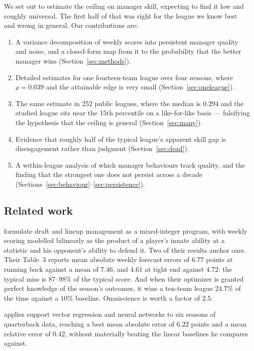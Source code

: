 \documentclass[11pt]{article}
\begin{document}
We set out to estimate the ceiling on manager skill, expecting to find it low
and roughly universal. The first half of that was right for the league we know
best and wrong in general. Our contributions are:

\begin{enumerate}
\item A variance decomposition of weekly scores into persistent manager quality
and noise, and a closed-form map from it to the probability that the better
manager wins (Section~\ref{sec:methods}).
\item Detailed estimates for one fourteen-team league over four seasons, where
$\rho = 0.039$ and the attainable edge is very small
(Section~\ref{sec:oneleague}).
\item The same estimate in 252 public leagues, where the median is $0.294$ and
the studied league sits near the 15th percentile on a like-for-like basis ---
falsifying the hypothesis that the ceiling is general (Section~\ref{sec:many}).
\item Evidence that roughly half of the typical league's apparent skill gap is
disengagement rather than judgment (Section~\ref{sec:dead}).
\item A within-league analysis of which manager behaviours track quality, and
the finding that the strongest one does not persist across a decade
(Sections~\ref{sec:behaviour}--\ref{sec:persistence}).
\end{enumerate}

\subsection*{Related work}

\citet{beckersun2016} formulate draft and lineup management as a mixed-integer
program, with weekly scoring modelled bilinearly as the product of a player's
innate ability at a statistic and his opponent's ability to defend it. Two of
their results anchor ours. Their Table~3 reports mean absolute weekly forecast
errors of $6.77$ points at running back against a mean of $7.46$, and $4.61$ at
tight end against $4.72$: the typical miss is 87--98\% of the typical score.
And when their optimizer is granted perfect knowledge of the season's outcomes,
it wins a ten-team league $24.7\%$ of the time against a $10\%$ baseline.
Omniscience is worth a factor of $2.5$.

\citet{lutz2015} applies support vector regression and neural networks to six
seasons of quarterback data, reaching a best mean absolute error of $6.22$
points and a mean relative error of $0.42$, without materially beating the
linear baselines he compares against.
\end{document}
